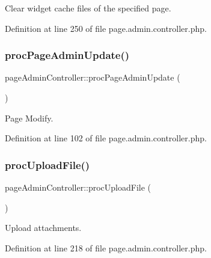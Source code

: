 Clear widget cache files of the specified page. 



Definition at line 250 of file page.\+admin.\+controller.\+php.

\hypertarget{classpageAdminController_a93c190dce6ce7759a509affc3f4b8167}{}\label{classpageAdminController_a93c190dce6ce7759a509affc3f4b8167} 
\subsubsection{\texorpdfstring{proc\+Page\+Admin\+Update()}{procPageAdminUpdate()}}
{\footnotesize\ttfamily page\+Admin\+Controller\+::proc\+Page\+Admin\+Update (\begin{DoxyParamCaption}{ }\end{DoxyParamCaption})}



Page Modify. 



Definition at line 102 of file page.\+admin.\+controller.\+php.

\hypertarget{classpageAdminController_a0bec7de800ea8fc74b75e71d829bffb2}{}\label{classpageAdminController_a0bec7de800ea8fc74b75e71d829bffb2} 
\subsubsection{\texorpdfstring{proc\+Upload\+File()}{procUploadFile()}}
{\footnotesize\ttfamily page\+Admin\+Controller\+::proc\+Upload\+File (\begin{DoxyParamCaption}{ }\end{DoxyParamCaption})}



Upload attachments. 



Definition at line 218 of file page.\+admin.\+controller.\+php.

\hypertarget{classpageAdminController_af0ce030cf373648852d09bb95cd318fa}{}\label{classpageAdminController_af0ce030cf373648852d09bb95cd318fa} 
